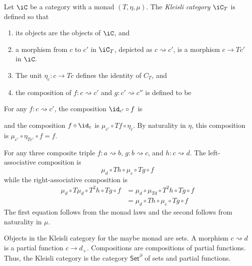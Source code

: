 \documentclass{amsart}
\begin{document}
\begin{defn}
  Let $\iC$ be a category with a monad $(T, \eta, \mu)$.
  The \emph{Kleisli category} $\iC_{T}$ is defined so that
  \begin{enumerate}
  \item its objects are the objects of $\iC$, and
  \item a morphism from $c$ to $c'$ in $\iC_{T}$, depicted as $c \rightsquigarrow c'$, is a morphism $c \to Tc'$ in $\iC$.
  \item The unit $\eta_{c} : c \to Tc$ defines the identity of $C_{T}$, and
  \item the composition of $f : c \rightsquigarrow c'$ and $g : c' \rightsquigarrow c''$ is defined to be
    
  \end{enumerate}
\end{defn}
For any $f : c \rightsquigarrow c'$, the composition $\id_{c'} \circ f$ is

and the composition $f \circ \id_{c}$ is $\mu_{c'} \circ Tf \circ \eta_{c}$.
By naturality in $\eta$, this composition is $\mu_{c'} \circ \eta_{Tc'} \circ f = f$.

For any three composite triple $f : a \rightsquigarrow b$, $g : b \rightsquigarrow c$, and $h : c \rightsquigarrow d$.
The left-associative composition is
\[
  \mu_{d} \circ Th \circ \mu_{c} \circ Tg \circ f
\]
while the right-associative composition is
\begin{align}
  \mu_{d} \circ T\mu_{d} \circ T^{2}h \circ Tg \circ f &= \mu_{d} \circ \mu_{Td} \circ T^{2}h \circ Tg \circ f\\
                                   &= \mu_{d} \circ Th \circ \mu_{c} \circ Tg \circ f
\end{align}
The first equation follows from the monad laws and the second follows from naturality in $\mu$.

\begin{eg}
  Objects in the Kleisli category for the maybe monad are sets.
  A morphism $c \rightsquigarrow d$ is a partial function $c \to d_{+}$.
  Compositions are compositions of partial functions.
  Thus, the Kleisli category is the category $\mathsf{Set}^{\partial}$ of sets and partial functions.
\end{eg}



\end{document}
